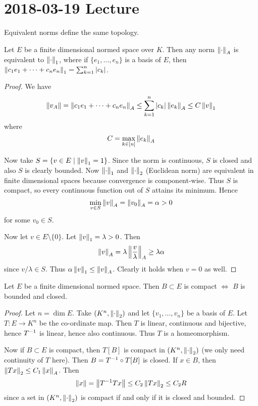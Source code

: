 \section{2018-03-19 Lecture}

\begin{rmk}
	Equivalent norms define the same topology.
\end{rmk}

\begin{prop}
	Let $E$ be a finite dimensional normed space over $K$.
	Then any norm $\left\lVert \cdot \right\rVert_A$ is equivalent to $\left\lVert \cdot \right\rVert_1$,
	where if $\{e_1,\ldots,e_n\}$ is a basis of $E$, then $\left\lVert c_1e_1+\cdots+c_ne_n \right\rVert_1 = \sum_{k=1}^n \left\lvert c_k \right\rvert$.
\end{prop}

\begin{proof}
	We have
	\[\left\lVert v_A \right\rVert = \left\lVert c_1e_1+\cdots+c_ne_n \right\rVert_A \leq \sum_{k=1}^n \left\lvert c_k \right\rvert\left\lVert e_k \right\rVert_A \leq C\left\lVert v \right\rVert_1\]
	where
	\[C = \max_{k \in [n]} \left\lVert e_k \right\rVert_A\]
	
	Now take $S = \{v \in E \mid \left\lVert v \right\rVert_1=1\}$.
	Since the norm is continuous, $S$ is closed and also $S$ is clearly bounded.
	Now $\left\lVert \cdot \right\rVert_1$ and $\left\lVert \cdot \right\rVert_2$ (Euclidean norm) are equivalent in finite dimensional spaces because convergence is component-wise.
	Thus $S$ is compact, so every continuous function out of $S$ attains its minimum.
	Hence
	\[\min_{v \in S} \left\lVert v \right\rVert_A = \left\lVert v_0 \right\rVert_A = \alpha>0\]
	for some $v_0 \in S$.
	
	Now let $v \in E \setminus \{0\}$.
	Let $\left\lVert v \right\rVert_1=\lambda>0$.
	Then
	\[\left\lVert v \right\rVert_A = \lambda \left\lVert \frac v\lambda \right\rVert_A \geq \lambda\alpha\]
	since $v/\lambda \in S$.
	Thus $\alpha\left\lVert v \right\rVert_1\leq\left\lVert v \right\rVert_A$.
	Clearly it holds when $v=0$ as well.
\end{proof}

\begin{cor}
	Let $E$ be a finite dimensional normed space.
	Then $B \subset E$ is compact $\iff$ $B$ is bounded and closed.
\end{cor}

\begin{proof}
	Let $n = \dim E$.
	Take $(K^n,\left\lVert \cdot \right\rVert_2)$ and let $\{v_1,\ldots,v_n\}$ be a basis of $E$.
	Let $T:E \to K^n$ be the co-ordinate map.
	Then $T$ is linear, continuous and bijective, hence $T^{-1}$ is linear, hence also continuous.
	Thus $T$ is a homeomorphism.
	
	Now if $B \subset E$ is compact, then $T[B]$ is compact in $(K^n,\left\lVert \cdot \right\rVert_2)$ (we only need continuity of $T$ here).
	Then $B = T^{-1}\circ T[B]$ is closed.
	If $x \in B$, then $\left\lVert Tx \right\rVert_2 \leq C_1\left\lVert x \right\rVert_A$.
	Then
	\[\left\lVert x \right\rVert=\left\lVert T^{-1} Tx \right\rVert \leq C_2 \left\lVert Tx \right\rVert_2 \leq C_2 R\]
	since a set in $(K^n,\left\lVert \cdot \right\rVert_2)$ is compact if and only if it is closed and bounded.
\end{proof}

